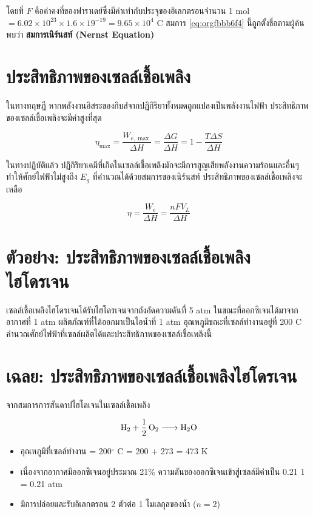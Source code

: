 \documentclass[a4paper,nobib,openany,10pt]{tufte-book}
\begin{document}
โดยที่ \(F\) คือค่าคงที่ของฟาราเดย์ซึ่งมีค่าเท่ากับประจุของอิเลกตรอนจำนวน 1 mol
\(= 6.02 \times 10^{23} \times 1.6 \times 19^{-19} = 9.65 \times 10^4 \text{ C}\)
สมการ \ref{eq:orgfbbb6f4} นี้ถูกตั้งชื่อตามผู้ค้นพบว่า \textbf{สมการเนิร์นสท์ (Nernst Equation)}

\section{ประสิทธิภาพของเซลล์เชื้อเพลิง}
\label{sec:org6dae297}
ในทางทฤษฎี หากพลังงานอิสระของกิบส์จากปฏิกิริยาทั้งหมดถูกแปลงเป็นพลังงานไฟฟ้า ประสิทธิภาพของเซลล์เชื้อเพลิงจะมีค่าสูงที่สุด

\begin{equation}
\label{eq:fc max eff}
  \eta_{\max} = \frac{W_{e,\max}}{\Delta H} = \frac{\Delta G}{\Delta H} = 1 - \frac{T \Delta S}{\Delta H}
\end{equation}

ในทางปฏิบัติแล้ว ปฏิกิริยาเคมีที่เกิดในเซลล์เชื้อเพลิงมักจะมีการสูญเสียพลังงานความร้อนและอื่นๆ ทำให้ศักย์ไฟฟ้าไม่สูงถึง \(E_g\) ที่คำนวณได้ด้วยสมการของเนิร์นสท์ ประสิทธิภาพของเซลล์เชื้อเพลิงจะเหลือ

\begin{equation}
\label{eq:fc act eff}
  \eta = \frac{W_e}{\Delta H} = \frac{nFV_L}{\Delta H}
\end{equation}

\section{ตัวอย่าง: ประสิทธิภาพของเซลล์เชื้อเพลิงไฮโดรเจน}
\label{sec:orgc6147e7}

เซลล์เชื้อเพลิงไฮโดรเจนได้รับไฮโดรเจนจากถังอัดความดันที่ 5 atm ในขณะที่ออกซิเจนได้มาจากอากาศที่ 1 atm ผลิตภัณฑ์ที่ได้ออกมาเป็นไอน้ำที่ 1 atm อุณหภูมิขณะที่เซลล์ทำงานอยู่ที่ 200 C คำนวณศักย์ไฟฟ้าที่เซลล์ผลิตได้และประสิทธิภาพของเซลล์เชื้อเพลิงนี้

\section{เฉลย: ประสิทธิภาพของเซลล์เชื้อเพลิงไฮโดรเจน}
\label{sec:org62d6ce4}
จากสมการการสันดาปไฮโดเจนในเซลล์เชื้อเพลิง

\[\ce{H2 + 1/2 O2 -> H2O}\]

\begin{itemize}
\item อุณหภูมิที่เซลล์ทำงาน = 200\(^{\circ}\) C = 200 + 273 = 473 K

\item เนื่องจากอากาศมีออกซิเจนอยู่ประมาณ 21\%
ความดันของออกซิเจนเข้าสู่เซลล์มีค่าเป็น 0.21 1 = 0.21 atm

\item มีการปล่อยและรับอิเลกตรอน 2 ตัวต่อ 1 โมเลกุลของน้ำ (\(n = 2\))
\end{itemize}
\end{document}
